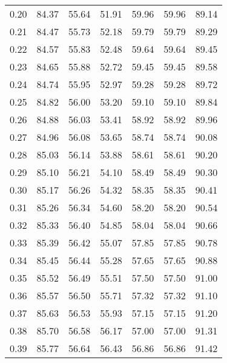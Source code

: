 \begin{tabular}{|c|c|c|c|c|c|c|}
      0.20 &     84.37 &     55.64 &      51.91 &   59.96 &      59.96 &         89.14 \\
      0.21 &     84.47 &     55.73 &      52.18 &   59.79 &      59.79 &         89.29 \\
      0.22 &     84.57 &     55.83 &      52.48 &   59.64 &      59.64 &         89.45 \\
      0.23 &     84.65 &     55.88 &      52.72 &   59.45 &      59.45 &         89.58 \\
      0.24 &     84.74 &     55.95 &      52.97 &   59.28 &      59.28 &         89.72 \\
      0.25 &     84.82 &     56.00 &      53.20 &   59.10 &      59.10 &         89.84 \\
      0.26 &     84.88 &     56.03 &      53.41 &   58.92 &      58.92 &         89.96 \\
      0.27 &     84.96 &     56.08 &      53.65 &   58.74 &      58.74 &         90.08 \\
      0.28 &     85.03 &     56.14 &      53.88 &   58.61 &      58.61 &         90.20 \\
      0.29 &     85.10 &     56.21 &      54.10 &   58.49 &      58.49 &         90.30 \\
      0.30 &     85.17 &     56.26 &      54.32 &   58.35 &      58.35 &         90.41 \\
      0.31 &     85.26 &     56.34 &      54.60 &   58.20 &      58.20 &         90.54 \\
      0.32 &     85.33 &     56.40 &      54.85 &   58.04 &      58.04 &         90.66 \\
      0.33 &     85.39 &     56.42 &      55.07 &   57.85 &      57.85 &         90.78 \\
      0.34 &     85.45 &     56.44 &      55.28 &   57.65 &      57.65 &         90.88 \\
      0.35 &     85.52 &     56.49 &      55.51 &   57.50 &      57.50 &         91.00 \\
      0.36 &     85.57 &     56.50 &      55.71 &   57.32 &      57.32 &         91.10 \\
      0.37 &     85.63 &     56.53 &      55.93 &   57.15 &      57.15 &         91.20 \\
      0.38 &     85.70 &     56.58 &      56.17 &   57.00 &      57.00 &         91.31 \\
      0.39 &     85.77 &     56.64 &      56.43 &   56.86 &      56.86 &         91.42 \\

\end{tabular}
